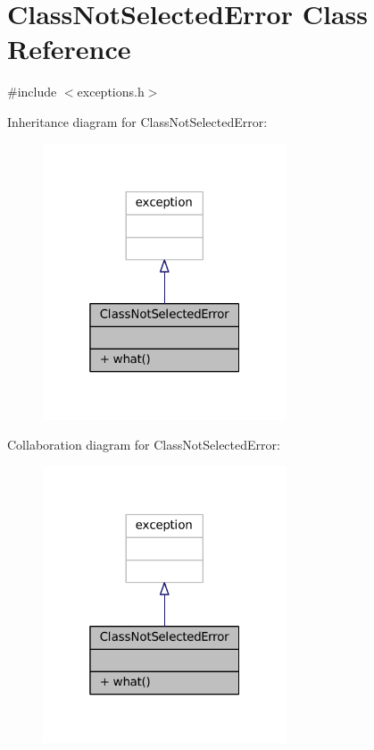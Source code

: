 \hypertarget{classClassNotSelectedError}{}\section{Class\+Not\+Selected\+Error Class Reference}
\label{classClassNotSelectedError}


{\ttfamily \#include $<$exceptions.\+h$>$}



Inheritance diagram for Class\+Not\+Selected\+Error\+:
\nopagebreak
\begin{figure}[H]
\begin{center}
\leavevmode
\includegraphics[width=205pt]{classClassNotSelectedError__inherit__graph}
\end{center}
\end{figure}


Collaboration diagram for Class\+Not\+Selected\+Error\+:
\nopagebreak
\begin{figure}[H]
\begin{center}
\leavevmode
\includegraphics[width=205pt]{classClassNotSelectedError__coll__graph}
\end{center}
\end{figure}

